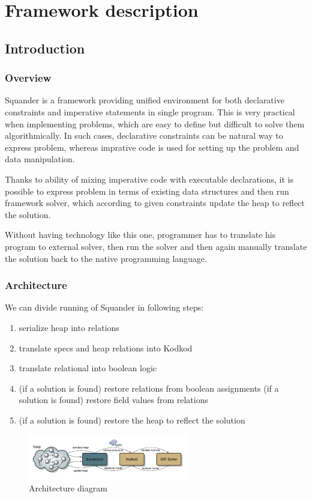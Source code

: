 \documentclass[11pt,twoside,a4paper]{book}
\begin{document}
\chapter{Framework description}
\label{chap:framework}
\section{Introduction}
\subsection{Overview}
Squander is a framework providing unified environment for both declarative
constraints and imperative statements in single program. This is very practical when
implementing problems, which are easy to define but difficult to solve them
algorithmically. In such cases, declarative constraints can be natural way to
express problem, whereas imprative code is used for setting up the problem and
data manipulation.

Thanks to ability of mixing imperative code with executable declarations, it is
possible to express problem in terms of existing data structures and then run
framework solver, which according to given constraints update the heap to
reflect the solution.


Without having technology like this one, programmer has to translate his program
to external solver, then run the solver and then again manually translate the
solution back to the native programming language.

\subsection{Architecture}
We can divide running of Squander in following steps:
\begin{enumerate}
  \item serialize heap into relations
  \item translate specs and heap relations into Kodkod
  \item translate relational into boolean logic
  \item (if a solution is found) restore relations from boolean assignments
  (if a solution is found) restore field values from relations
  \item (if a solution is found) restore the heap to reflect the solution
   
\end{enumerate}
\begin{figure}[ht]
\begin{center}
\includegraphics[width=7cm]{figures/architecture-diagram}
\caption{Architecture diagram}
\label{fig:architecture}
\end{center}
\end{figure}
\end{document}
